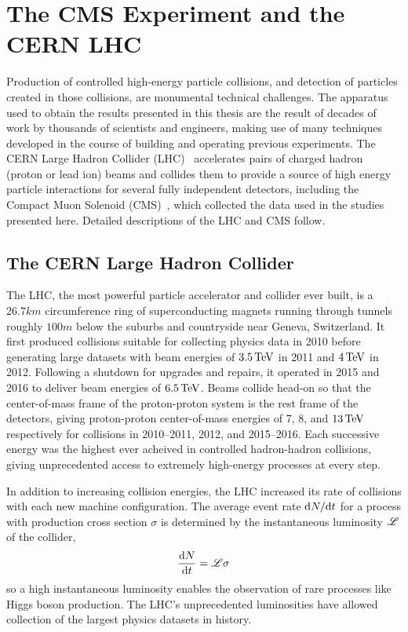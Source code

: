 
\chapter{The CMS Experiment and the CERN LHC}
Production of controlled high-energy particle collisions, and detection of particles created in those collisions, are monumental technical challenges.
The apparatus used to obtain the results presented in this thesis are the result of decades of work by thousands of scientists and engineers, making use of many techniques developed in the course of building and operating previous experiments.
The CERN Large Hadron Collider (LHC)~\cite{Evans:2008zzb,Bruning2012705} accelerates pairs of charged hadron (proton or lead ion) beams and collides them to provide a source of high energy particle interactions for several fully independent detectors, including the Compact Muon Solenoid (CMS)~\cite{Chatrchyan:2008zzk}, which collected the data used in the studies presented here. Detailed descriptions of the LHC and CMS follow.



\section{The CERN Large Hadron Collider}
The LHC, the most powerful particle accelerator and collider ever built, is a $26.7\unit{km}$ circumference ring of superconducting magnets running through tunnels roughly $100\unit{m}$ below the suburbs and countryside near Geneva, Switzerland.
It first produced collisions suitable for collecting physics data in 2010 before generating large datasets with beam energies of $3.5\,\mathrm{Te\hspace{-.08em}V}$ in 2011 and $4\,\mathrm{Te\hspace{-.08em}V}$ in 2012.
Following a shutdown for upgrades and repairs, it operated in 2015 and 2016 to deliver beam energies of $6.5\,\mathrm{Te\hspace{-.08em}V}$.
Beams collide head-on so that the center-of-mass frame of the proton-proton system is the rest frame of the detectors, giving proton-proton center-of-mass energies of 7, 8, and $13\,\mathrm{Te\hspace{-.08em}V}$ respectively for collisions in 2010--2011, 2012, and 2015--2016.
Each successive energy was the highest ever acheived in controlled hadron-hadron collisions, giving unprecedented access to extremely high-energy processes at every step.

In addition to increasing collision energies, the LHC increased its rate of collisions with each new machine configuration.
The average event rate $\mathrm{d} N/\mathrm{d} t$ for a process with production cross section $\sigma$ is determined by the instantaneous luminosity $\mathscr{L}$ of the collider,
\begin{equation}
  \label{eq:instLumi}
  \frac{\mathrm{d} N}{\mathrm{d} t} = \mathscr{L}\sigma
\end{equation}
so a high instantaneous luminosity enables the observation of rare processes like Higgs boson production.
The LHC's unprecedented luminosities have allowed collection of the largest physics datasets in history.

